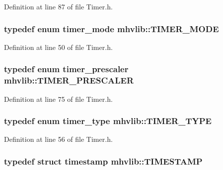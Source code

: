Definition at line 87 of file Timer.\-h.

\hypertarget{namespacemhvlib_a7e3e41da5cee0e53606cd51fe2cd2dc7}{
\subsubsection[{T\-I\-M\-E\-R\-\_\-\-M\-O\-D\-E}]{\setlength{\rightskip}{0pt plus 5cm}typedef enum {\bf timer\-\_\-mode} {\bf mhvlib\-::\-T\-I\-M\-E\-R\-\_\-\-M\-O\-D\-E}}}\label{namespacemhvlib_a7e3e41da5cee0e53606cd51fe2cd2dc7}


Definition at line 50 of file Timer.\-h.

\hypertarget{namespacemhvlib_ae280d2a7103fc576dbd0e8880c574e6c}{
\subsubsection[{T\-I\-M\-E\-R\-\_\-\-P\-R\-E\-S\-C\-A\-L\-E\-R}]{\setlength{\rightskip}{0pt plus 5cm}typedef enum {\bf timer\-\_\-prescaler} {\bf mhvlib\-::\-T\-I\-M\-E\-R\-\_\-\-P\-R\-E\-S\-C\-A\-L\-E\-R}}}\label{namespacemhvlib_ae280d2a7103fc576dbd0e8880c574e6c}


Definition at line 75 of file Timer.\-h.

\hypertarget{namespacemhvlib_a52fce76188d4cfd21a4af570cf2db41d}{
\subsubsection[{T\-I\-M\-E\-R\-\_\-\-T\-Y\-P\-E}]{\setlength{\rightskip}{0pt plus 5cm}typedef enum {\bf timer\-\_\-type} {\bf mhvlib\-::\-T\-I\-M\-E\-R\-\_\-\-T\-Y\-P\-E}}}\label{namespacemhvlib_a52fce76188d4cfd21a4af570cf2db41d}


Definition at line 56 of file Timer.\-h.

\hypertarget{namespacemhvlib_ae0658d1591e8aabca3a4b259a0c483cd}{
\subsubsection[{T\-I\-M\-E\-S\-T\-A\-M\-P}]{\setlength{\rightskip}{0pt plus 5cm}typedef struct {\bf timestamp} {\bf mhvlib\-::\-T\-I\-M\-E\-S\-T\-A\-M\-P}}}\label{namespacemhvlib_ae0658d1591e8aabca3a4b259a0c483cd}


